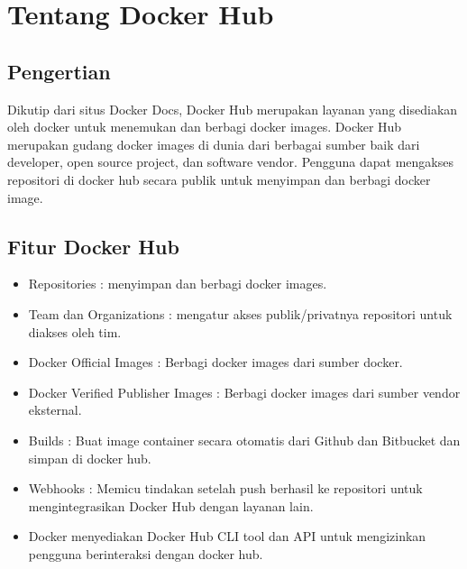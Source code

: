 \chapter{Tentang Docker Hub}

\section{Pengertian}
Dikutip dari situs Docker Docs, Docker Hub merupakan layanan yang disediakan oleh docker untuk menemukan dan berbagi docker images. Docker Hub merupakan gudang docker images di dunia dari berbagai sumber baik dari developer, open source project, dan software vendor. Pengguna dapat mengakses repositori di docker hub secara publik untuk menyimpan dan berbagi docker image. 

\section{Fitur Docker Hub}
    \begin{itemize}
        \item Repositories : menyimpan dan berbagi docker images.
        \item Team dan Organizations : mengatur akses publik/privatnya repositori untuk diakses oleh tim.
        \item Docker Official Images : Berbagi docker images dari sumber docker.
        \item Docker Verified Publisher Images : Berbagi docker images dari sumber vendor eksternal.
        \item Builds : Buat image container secara otomatis dari Github dan Bitbucket dan simpan di docker hub.
        \item Webhooks : Memicu tindakan setelah push berhasil ke repositori untuk mengintegrasikan Docker Hub dengan layanan lain.
        \item Docker menyediakan Docker Hub CLI tool dan API untuk mengizinkan pengguna berinteraksi dengan docker hub.
    \end{itemize}
